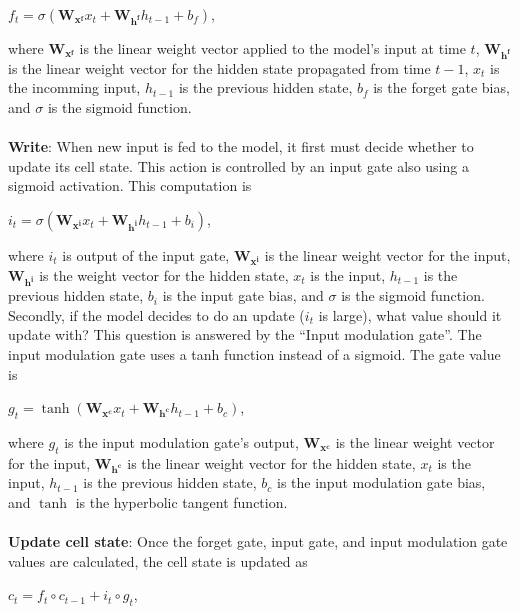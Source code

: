\hfil $ f_t = \sigma(\mathbf{W_{x^f}}x_t + \mathbf{W_{h^f}}h_{t-1} + b_f) $, \par 

where $\mathbf{W_{x^f}}$ is the linear weight vector applied to the model's input at time $t$, $\mathbf{W_{h^f}}$ is the linear weight vector for the hidden state propagated from time $t-1$, $x_t$ is the incomming input, $h_{t-1}$ is the previous hidden state, $b_f$ is the forget gate bias, and $\sigma$ is the sigmoid function.

\paragraph{}
\textbf{Write}: When new input is fed to the model, it first must decide whether to update its cell state. This action is controlled by an input gate also using a sigmoid activation. This computation is 

\hfil $ i_t = \sigma(\mathbf{W_{x^i}}x_t + \mathbf{W_{h^i}}h_{t-1} + b_i) $, \par

where $i_t$ is output of the input gate, $\mathbf{W_{x^i}}$ is the linear weight vector for the input, $\mathbf{W_{h^i}}$ is the weight vector for the hidden state, $x_t$ is the input, $h_{t-1}$ is the previous hidden state, $b_i$ is the input gate bias, and $\sigma$ is the sigmoid function. Secondly, if the model decides to do an update ($i_t$ is large), what value should it update with? This question is answered by the “Input modulation gate”. The input modulation gate uses a tanh function instead of a sigmoid. The gate value is 

\hfil $ g_t = \tanh(\mathbf{W_{x^c}}x_t + \mathbf{W_{h^c}}h_{t-1} + b_c) $, \par 

where $g_t$ is the input modulation gate's output, $\mathbf{W_{x^c}}$ is the linear weight vector for the input, $\mathbf{W_{h^c}}$ is the linear weight vector for the hidden state, $x_t$ is the input, $h_{t-1}$ is the previous hidden state, $b_c$ is the input modulation gate bias, and $\tanh$ is the hyperbolic tangent function.

\paragraph{}
\textbf{Update cell state}: Once the forget gate, input gate, and input modulation gate values are calculated, the cell state is updated as

\hfil $c_t = f_t \circ c_{t-1} + i_t \circ g_t $, \par 

